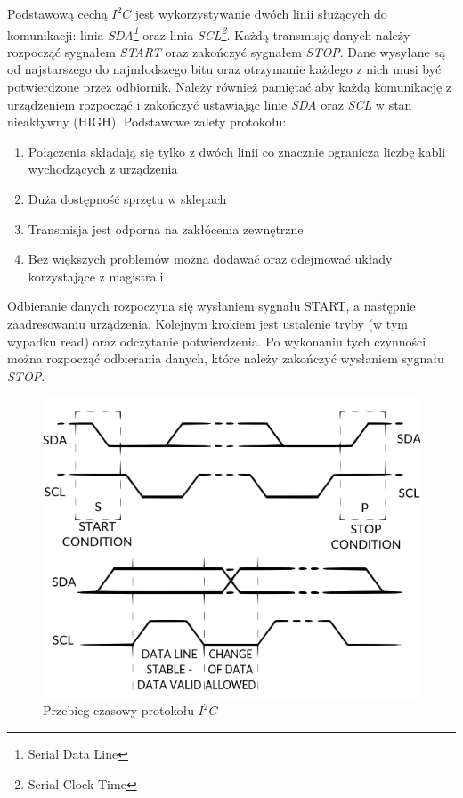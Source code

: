 \documentclass{xmgr}
\begin{document}
Podstawową cechą \emph{$I^2C$} jest wykorzystywanie dwóch linii służących do komunikacji: linia \emph{SDA\footnote{Serial Data Line}} oraz linia \emph{SCL\footnote{Serial Clock Time}}. Każdą transmisję danych należy rozpocząć sygnałem \emph{START} oraz zakończyć sygnałem \emph{STOP}. Dane wysyłane są od najstarszego do najmłodszego bitu oraz otrzymanie każdego z nich musi być potwierdzone przez odbiornik. Należy również pamiętać aby każdą komunikację z urządzeniem rozpocząć i zakończyć ustawiając linie \emph{SDA} oraz \emph{SCL} w stan nieaktywny (HIGH). Podstawowe zalety protokołu:
\begin{enumerate}
	\item Połączenia składają się tylko z dwóch linii co znacznie ogranicza liczbę kabli wychodzących z urządzenia
	\item Duża dostępność sprzętu w sklepach
	\item Transmisja jest odporna na zakłócenia zewnętrzne
	\item Bez większych problemów można dodawać oraz odejmować układy korzystające z magistrali
\end{enumerate}
Odbieranie danych rozpoczyna się wysłaniem sygnału START, a następnie zaadresowaniu urządzenia. Kolejnym krokiem jest ustalenie tryby (w tym wypadku read) oraz odczytanie potwierdzenia. Po wykonaniu tych czynności można rozpocząć odbierania danych, które należy zakończyć wysłaniem sygnału \emph{STOP}.

\begin{figure}[!h]
    \centering
    \includegraphics[height=0.4\textheight]{images/i2c.png}
    \caption{Przebieg czasowy protokołu $I^2C$}
\end{figure}
\end{document}

